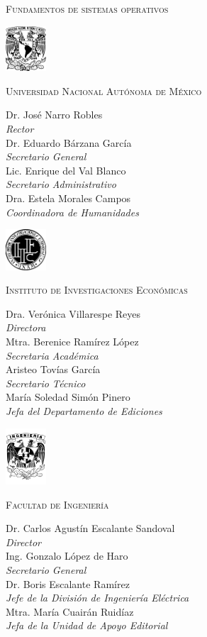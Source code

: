 \pagestyle{empty}
\renewcommand{\thepage}{\arabic{page}}

\textsc{Fundamentos de sistemas operativos}
\eject

\begin{center}
  \includegraphics[width=1.5cm]{unam/logo_unam}

  \textsc{Universidad Nacional Autónoma de México}

  Dr. José Narro Robles\\\textit{Rector}\\
  Dr. Eduardo Bárzana García\\\textit{Secretario General}\\
  Lic. Enrique del Val Blanco\\\textit{Secretario Administrativo}\\
  Dra. Estela Morales Campos\\\textit{Coordinadora de Humanidades}

  \vfill
  \includegraphics[width=1.5cm]{unam/logo_iiec}

  \textsc{Instituto de Investigaciones Económicas}

  Dra. Verónica Villarespe Reyes\\\textit{Directora}\\
  Mtra. Berenice Ramírez López\\\textit{Secretaria Académica}\\
  Aristeo Tovías García\\\textit{Secretario Técnico}\\
  María Soledad Simón Pinero\\\textit{Jefa del Departamento de Ediciones}

  \vfill
  \includegraphics[width=1.5cm]{unam/logo_fi}

  \textsc{Facultad de Ingeniería}

  Dr. Carlos Agustín Escalante Sandoval\\\textit{Director}\\
  Ing. Gonzalo López de Haro\\\textit{Secretario General}\\
  Dr. Boris Escalante Ramírez\\\textit{Jefe de la División de
    Ingeniería Eléctrica}\\
  Mtra. María Cuairán Ruidíaz\\\textit{Jefa de la Unidad de Apoyo Editorial}

\end{center}



